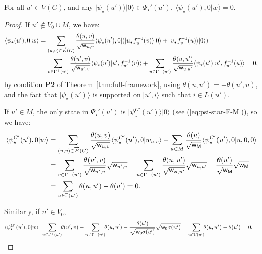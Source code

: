 \documentclass{theoretics}
\newcommand{\eq}[1]{\hyperref[eq:#1]{(\ref*{eq:#1})}}
\newcommand{\thm}[1]{\hyperref[thm:#1]{Theorem~\ref*{thm:#1}}}
\def\ket#1{{\lvert}#1\rangle}
\def\bra#1{{\langle}#1\rvert}
\renewcommand{\>}{\rangle}
\newcommand{\<}{\langle}
\renewcommand{\(}{\left(}
\renewcommand{\)}{\right)}
\def\braket#1#2{{{\langle}#1\vert}#2\rangle}
\def\w{{\sf w}}
\begin{document}
\begin{claim}\label{clm:ortho2}
For all $u'\in V(G)$, and any $\ket{\psi_{\star}(u')}\ket{0}\in \Psi_{\star}'(u')$, $\braket{\psi_{\star}(u'),0}{w}=0$.
\end{claim}
\begin{proof}
If $u'\not\in V_0\cup M$, we have:
\begin{align*}
\braket{\psi_{\star}(u'),0}{w} &= \sum_{(u,v)\in\overrightarrow{E}(G)}\frac{\theta(u,v)}{\sqrt{\w_{u,v}}}\bra{\psi_{\star}(u'),0}(\ket{u,f_u^{-1}(v)}\ket{0}+\ket{v,f_v^{-1}(u)}\ket{0})\\
&= \sum_{v\in\Gamma^+(u')}\frac{\theta(u',v)}{\sqrt{\w_{u',v}}}\braket{\psi_\star(u')}{u',f_{u'}^{-1}(v)}
+\sum_{u\in\Gamma^-(u')}\frac{\theta(u,u')}{\sqrt{\w_{u,u'}}}\braket{\psi_\star(u')}{u',f_{u'}^{-1}(u)}=0,
\end{align*}
by condition \textbf{P2} of \thm{full-framework}, using $\theta(u,u')=-\theta(u',u)$, and the fact that $\ket{\psi_\star(u')}$ is supported on $\ket{u',i}$ such that $i\in L(u')$.

\noindent If $u'\in M$, the only state in $\Psi_{\star}'(u')$ is $\ket{\psi_{\star}^{G'}(u')}\ket{0}$ (see \eq{psi-star-F-M}), so we have:
\begin{align*}
\braket{\psi_{\star}^{G'}(u'),0}{w} &= \sum_{(u,v)\in\overrightarrow{E}(G)}\frac{\theta(u,v)}{\sqrt{\w_{u,v}}}\braket{\psi_{\star}^{G'}(u'),0}{w_{u,v}}
-\sum_{u\in M}\frac{\theta(u)}{\sqrt{\w_{\sf M}}}\braket{\psi_{\star}^{G'}(u'),0}{u,0,0}\\
&= \sum_{v\in\Gamma^+(u')}\frac{\theta(u',v)}{\sqrt{\w_{u',v}}}\sqrt{\w_{u',v}}
-\sum_{u\in\Gamma^-(u')}\frac{\theta(u,u')}{\sqrt{\w_{u,u'}}}\sqrt{\w_{u,u'}}-\frac{\theta(u')}{\sqrt{\w_{\sf M}}}\sqrt{\w_{\sf M}}\\
&= \sum_{u\in\Gamma(u')}\theta(u,u') - \theta(u') = 0.
\end{align*}

\noindent Similarly, if $u'\in V_0$, 
\begin{align*}
\braket{\psi_{\star}^{G'}(u'),0}{w} 
&= \!\!\!\!\sum_{v\in\Gamma^+(u')}\!\!\theta(u',v)
-\sum_{u\in\Gamma^-(u')}\!\!\theta(u,u')-\frac{\theta(u')}{\sqrt{\w_0\sigma(u')}}\sqrt{\w_0\sigma(u')}
= \sum_{u\in\Gamma(u')}\!\!\theta(u,u') - \theta(u') = 0.\qedhere
\end{align*}
\end{proof}
\end{document}
